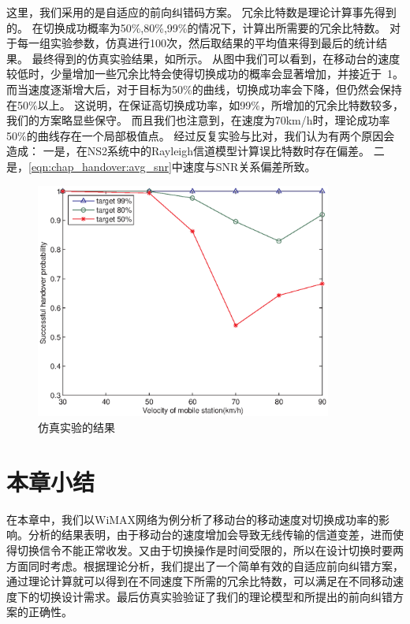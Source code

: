 这里，我们采用的是自适应的前向纠错码方案。
冗余比特数是理论计算事先得到的。
在切换成功概率为50\%,80\%,99\%的情况下，计算出所需要的冗余比特数。
对于每一组实验参数，仿真进行100次，然后取结果的平均值来得到最后的统计结果。
最终得到的仿真实验结果，如所示。
从图中我们可以看到，在移动台的速度较低时，少量增加一些冗余比特会使得切换成功的概率会显著增加，并接近于~1。
而当速度逐渐增大后，对于目标为50\%的曲线，切换成功率会下降，但仍然会保持在50\%以上。
这说明，在保证高切换成功率，如99\%，所增加的冗余比特数较多，我们的方案略显些保守。
而且我们也注意到，在速度为70km/h时，理论成功率50\%的曲线存在一个局部极值点。
经过反复实验与比对，我们认为有两个原因会造成：
一是，在NS2系统中的Rayleigh信道模型计算误比特数时存在偏差。
二是，\eqref{eqn:chap_handover:avg_snr}中速度与SNR关系偏差所致。

\begin{figure}[t]
\begin{centering}
\includegraphics[height=7.75cm]{iccs_speed_prob_simu}
\caption{仿真实验的结果}
\label{fig:chap_iccs_results}
\end{centering}
\end{figure}

\section{本章小结}
在本章中，我们以WiMAX网络为例分析了移动台的移动速度对切换成功率的影响。分析的结果表明，由于移动台的速度增加会导致无线传输的信道变差，进而使得切换信令不能正常收发。又由于切换操作是时间受限的，所以在设计切换时要两方面同时考虑。根据理论分析，我们提出了一个简单有效的自适应前向纠错方案，通过理论计算就可以得到在不同速度下所需的冗余比特数，可以满足在不同移动速度下的切换设计需求。最后仿真实验验证了我们的理论模型和所提出的前向纠错方案的正确性。
